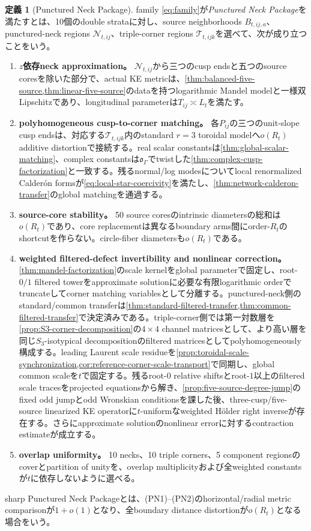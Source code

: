 \documentclass[11pt,a4paper]{ltjsarticle}
\theoremstyle{definition}
\newtheorem{definition}[theorem]{定義}
\theoremstyle{remark}
\begin{document}
\begin{definition}[Punctured Neck Package]\label{def:PNP}
family \eqref{eq:family}が\emph{Punctured Neck Package}を満たすとは、10個のdouble strataに対し、source neighborhoods $B_{t,ij,a}$、punctured-neck regions $\mathcal N_{t,ij}$、triple-corner regions $\mathcal T_{t,ijk}$を選べて、次が成り立つことをいう。
\begin{enumerate}[label=(PN\arabic*),leftmargin=3.4em]
\item \textbf{$z$依存neck approximation。}
$\mathcal N_{t,ij}$から三つのcusp endsと五つのsource coresを除いた部分で、actual KE metricは、\cref{thm:balanced-five-source,thm:linear-five-source}のdataを持つlogarithmic Mandel modelと一様双Lipschitzであり、longitudinal parameterは$T_{ij}\asymp L_t$を満たす。
\item \textbf{polyhomogeneous cusp-to-corner matching。}
各$P_{ij}$の三つのunit-slope cusp endsは、対応する$\mathcal T_{t,ijk}$内のstandard $r=3$ toroidal modelへ$o(R_t)$ additive distortionで接続する。real scalar constantsは\cref{thm:global-scalar-matching}、complex constantsは$\mathfrak o_\Gamma$でtwistした\cref{thm:complex-cusp-factorization}と一致する。残るnormal/log modesについてlocal renormalized Calder\'on formsが\eqref{eq:local-star-coercivity}を満たし、\cref{thm:network-calderon-transfer}のglobal matchingを通過する。
\item \textbf{source-core stability。}
50 source coresのintrinsic diametersの総和は$o(R_t)$であり、core replacementは異なるboundary arms間にorder-$R_t$のshortcutを作らない。circle-fiber diametersも$o(R_t)$である。
\item \textbf{weighted filtered-defect invertibility and nonlinear correction。}
\cref{thm:mandel-factorization}のscale kernelをglobal parameterで固定し、root-$0/1$ filtered towerをapproximate solutionに必要な有限logarithmic orderでtruncateしてcorner matching variablesとして分離する。punctured-neck側のstandard/common transferは\cref{thm:standard-filtered-transfer,thm:common-filtered-transfer}で決定済みである。triple-corner側では第一対数層を\cref{prop:S3-corner-decomposition}の$4\times4$ channel matricesとして、より高い層を同じ$S_3$-isotypical decompositionのfiltered matricesとしてpolyhomogeneously構成する。leading Laurent scale residueを\cref{prop:toroidal-scale-synchronization,cor:reference-corner-scale-transport}で同期し、global common scaleを$t$で固定する。残るroot-$0$ relative shiftsとroot-$1$以上のfiltered scale tracesをprojected equationsから解き、\cref{prop:five-source-degree-jump}のfixed odd jumpとodd Wronskian conditionsを課した後、three-cusp/five-source linearized KE operatorに$t$-uniformなweighted Hölder right inverseが存在する。さらにapproximate solutionのnonlinear errorに対するcontraction estimateが成立する。
\item \textbf{overlap uniformity。}
10 necks、10 triple corners、5 component regionsのcoverとpartition of unityを、overlap multiplicityおよび全weighted constantsが$t$に依存しないように選べる。
\end{enumerate}
sharp Punctured Neck Packageとは、(PN1)--(PN2)のhorizontal/radial metric comparisonが$1+o(1)$となり、全boundary distance distortionが$o(R_t)$となる場合をいう。
\end{definition}
\end{document}
